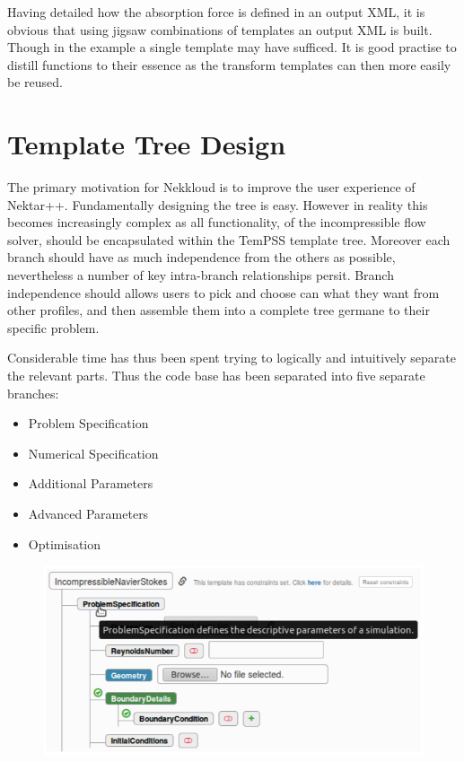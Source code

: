 \documentclass[11pt, a4paper]{report}
\begin{document}
Having detailed how the absorption force is defined in an output XML, it is obvious that using jigsaw combinations of templates an output XML is built. Though in the example a single template may have sufficed. It is good practise to distill functions to their essence as the transform templates can then more easily be reused.

\section{Template Tree Design}
The primary motivation for Nekkloud is to improve the user experience of Nektar++. Fundamentally designing the tree is easy. However in reality this becomes increasingly complex as all functionality, of the incompressible flow solver, should be encapsulated within the TemPSS template tree. Moreover each branch should have as much independence from the others as possible, nevertheless a number of key intra-branch relationships persit. Branch independence should allows users to pick and choose can what they want from other profiles, and then assemble them into a complete tree germane to their specific problem.

Considerable time has thus been spent trying to logically and intuitively separate the relevant parts. Thus the code base has been separated into five separate branches:

\begin{itemize}
\item Problem Specification
\item Numerical Specification
\item Additional Parameters
\item Advanced Parameters
\item Optimisation
\end{itemize}

\begin{figure}[htb!]
 \centering
 \includegraphics[width=.75\linewidth,  clip=true, trim = 0cm 0cm 0cm 0cm]{documentation}
 \label{fig:documentation}
\end{figure}
\end{document}
